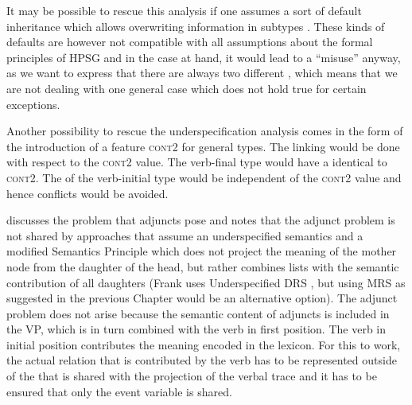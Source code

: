 \begin{exe}
\begin{xlist}
It may be possible to rescue this analysis if one assumes a sort of default inheritance which allows overwriting information in subtypes \citep{LC99a}.
These kinds of defaults are however not compatible with all assumptions about the formal principles
of HPSG and in the case at hand, it would lead to a ``misuse'' anyway, as we want to express that there are
always two different \contvs, which means that we are not dealing with one general case which does not
hold true for certain exceptions.  

Another possibility to rescue the underspecification analysis comes in the form of the introduction of a feature
\textsc{cont2} for general types. The linking would be done with respect to the \textsc{cont2} value. The verb-final type would have a \contv identical to
\textsc{cont2}. The \contv of the verb-initial type would be independent of the \textsc{cont2}
value and hence conflicts would be avoided.

\citet{Frank94b} discusses the problem that adjuncts pose and notes that the adjunct problem is not shared by
approaches that assume an underspecified semantics and a modified Semantics Principle which does
not project the meaning of the mother node from the daughter of the head, but rather combines lists
with the semantic contribution of all daughters (Frank uses Underspecified DRS \citep{FR95a-u}, but using MRS
as suggested in the previous Chapter would be an alternative option). The adjunct problem does not arise because the semantic
content of adjuncts is included in the VP, which is in turn combined with the verb in first
position. The verb in initial position contributes the meaning encoded in the lexicon. For this to
work, the actual relation that is contributed by the verb has to be represented outside of the
\contv that is shared with the projection of the verbal trace and it has to be ensured that only the
event variable is shared.


\end{xlist}
\end{exe}
